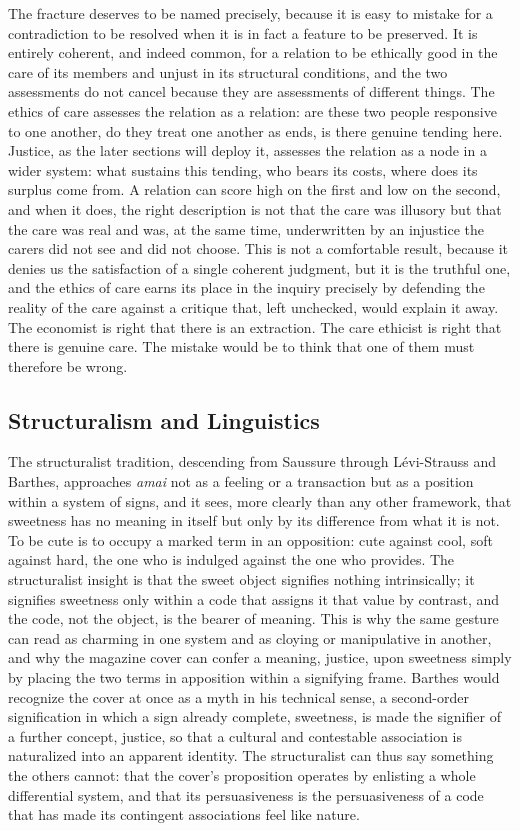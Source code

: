\documentclass[11pt,a4paper]{article}
\begin{document}
The fracture deserves to be named precisely, because it is easy to mistake for a contradiction to be resolved when it is in fact a feature to be preserved. It is entirely coherent, and indeed common, for a relation to be ethically good in the care of its members and unjust in its structural conditions, and the two assessments do not cancel because they are assessments of different things. The ethics of care assesses the relation as a relation: are these two people responsive to one another, do they treat one another as ends, is there genuine tending here. Justice, as the later sections will deploy it, assesses the relation as a node in a wider system: what sustains this tending, who bears its costs, where does its surplus come from. A relation can score high on the first and low on the second, and when it does, the right description is not that the care was illusory but that the care was real and was, at the same time, underwritten by an injustice the carers did not see and did not choose. This is not a comfortable result, because it denies us the satisfaction of a single coherent judgment, but it is the truthful one, and the ethics of care earns its place in the inquiry precisely by defending the reality of the care against a critique that, left unchecked, would explain it away. The economist is right that there is an extraction. The care ethicist is right that there is genuine care. The mistake would be to think that one of them must therefore be wrong.

\subsection{Structuralism and Linguistics}

The structuralist tradition, descending from Saussure through Lévi-Strauss and Barthes, approaches \textit{amai} not as a feeling or a transaction but as a position within a system of signs, and it sees, more clearly than any other framework, that sweetness has no meaning in itself but only by its difference from what it is not. To be cute is to occupy a marked term in an opposition: cute against cool, soft against hard, the one who is indulged against the one who provides. The structuralist insight is that the sweet object signifies nothing intrinsically; it signifies sweetness only within a code that assigns it that value by contrast, and the code, not the object, is the bearer of meaning. This is why the same gesture can read as charming in one system and as cloying or manipulative in another, and why the magazine cover can confer a meaning, justice, upon sweetness simply by placing the two terms in apposition within a signifying frame. Barthes would recognize the cover at once as a myth in his technical sense, a second-order signification in which a sign already complete, sweetness, is made the signifier of a further concept, justice, so that a cultural and contestable association is naturalized into an apparent identity. The structuralist can thus say something the others cannot: that the cover's proposition operates by enlisting a whole differential system, and that its persuasiveness is the persuasiveness of a code that has made its contingent associations feel like nature.
\end{document}

